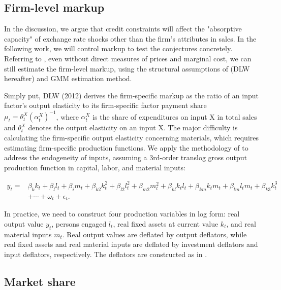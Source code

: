 \documentclass[12pt]{article}
\begin{document}
\subsection{Firm-level markup}

In the discussion, we argue that credit constraints will affect the "absorptive capacity" of exchange rate shocks other than the firm's attributes in sales. In the following work, we will control markup to test the conjectures concretely. Referring to \cite{bkl2021}, even without direct measures of prices and marginal cost, we can still estimate the firm-level markup, using the structural assumptions of \cite{dlw2012} (DLW hereafter) and GMM estimation method.

Simply put, DLW (2012)\cite{dlw2012} derives the firm-specific markup as the ratio of an input factor's output elasticity to its firm-specific factor payment share $\mu_{t}=\theta_{t}^{X}\left(\alpha_{t}^{X}\right)^{-1}$, where $\alpha_{t}^{X}$ is the share of expenditures on input X in total sales and $\theta^X_t$ denotes the output elasticity on an input X. The major difficulty is calculating the firm-specific output elasticity concerning materials, which requires estimating firm-specific production functions. We apply the methodology of \cite{acf2015} to address the endogeneity of inputs, assuming a 3rd-order translog gross output production function in capital, labor, and material inputs:

$$
\begin{aligned}
	y_{t}= &\beta_{k} k_{t}+\beta_{l} l_{t}+\beta_{i} m_{t}+\beta_{k 2} k_{t}^{2}+\beta_{l 2} l_{t}^{2}+\beta_{m 2} m_{t}^{2}+\beta_{k l} k_{ t} l_{t}+\beta_{k m} k_{t} m_{t}+\beta_{l m} l_{t} m_{t}+\beta_{k 3} k_{t}^{3}\\
	&+\cdots+\omega_{t}+\epsilon_{t}.
\end{aligned}
$$

In practice, we need to construct four production variables in log form: real output value $y_t$, persons engaged $l_t$, real fixed assets at current value $k_t$, and real material inputs $m_t$. Real output values are deflated by output deflators, while real fixed assets and real material inputs are deflated by investment deflators and input deflators, respectively. The deflators are constructed as in \cite{brandt2012}.

\subsection{Market share}
\end{document}
